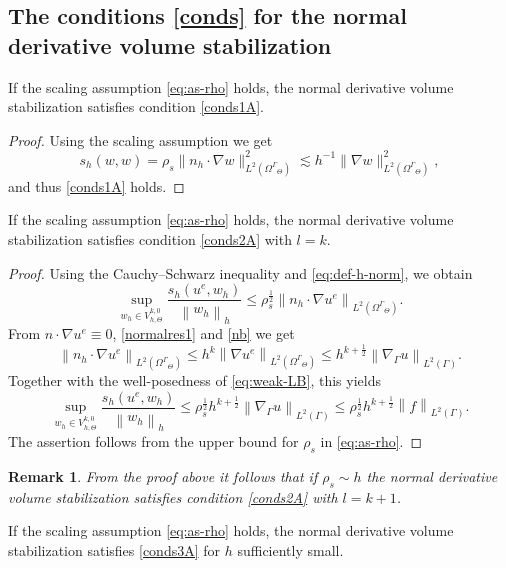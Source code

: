 \documentclass[final]{siamltex}
\newtheorem{remark}{Remark}
\begin{document}
\subsection{The conditions \eqref{conds} for the normal derivative volume stabilization} \label{sec:proofs:easy}
\begin{lemma}
  If the scaling assumption \eqref{eq:as-rho} holds, the normal derivative volume stabilization satisfies condition \eqref{conds1A}.
\end{lemma}

\begin{proof}
Using the scaling assumption we get
\[
  s_h(w,w) = \rho_s\|n_h \cdot \nabla w\|_{L^2({\Omega^{\Gamma}}_\Theta)}^2 \lesssim h^{-1} \|\nabla w\|_{L^2({\Omega^{\Gamma}}_\Theta)}^2,
\]
and thus
\eqref{conds1A} holds.
\end{proof}

\begin{lemma}
  If the scaling assumption \eqref{eq:as-rho} holds, the normal derivative volume stabilization satisfies condition \eqref{conds2A} with $l=k$.
\end{lemma}

\begin{proof}
Using the Cauchy--Schwarz inequality and \eqref{eq:def-h-norm}, we obtain
\[
  \sup_{w_h\in {V_{h,\Theta}^{k,0}}}\frac{s_h(u^e,w_h)}{{\left\lVert {w_h} \right\rVert}_h}\le \rho_s^{\frac12}{\left\lVert {n_h\cdot\nabla u^e} \right\rVert}_{L^2({\Omega^{\Gamma}}_\Theta)}.
\]
From $n\cdot\nabla u^e\equiv 0$, \eqref{normalres1} and \eqref{nb} we get
\[
  {\left\lVert {n_h\cdot\nabla u^e} \right\rVert}_{L^2({\Omega^{\Gamma}}_\Theta)}\le h^k{\left\lVert {\nabla u^e} \right\rVert}_{L^2({\Omega^{\Gamma}}_\Theta)}\le h^{k+\frac12}{\left\lVert {\nabla_\Gamma u} \right\rVert}_{L^2(\Gamma)}.
\]
Together with the well-posedness of \eqref{eq:weak-LB}, this yields
\[
  \sup_{w_h\in {V_{h,\Theta}^{k,0}}}\frac{s_h(u^e,w_h)}{{\left\lVert {w_h} \right\rVert}_h}\le \rho_s^{\frac12}h^{k+\frac12}{\left\lVert {\nabla_\Gamma u} \right\rVert}_{L^2(\Gamma)}\le \rho_s^{\frac12}h^{k+\frac12}{\left\lVert {f} \right\rVert}_{L^2(\Gamma)}.
\]
The assertion follows from the upper bound for $\rho_s$ in \eqref{eq:as-rho}.
\end{proof}
\begin{remark} \rm From the proof above it follows that if $\rho_s \sim h$ the normal derivative volume stabilization satisfies condition \eqref{conds2A} with $l=k+1$.
\end{remark}
\begin{lemma} \label{lemma3A}
   If the scaling assumption \eqref{eq:as-rho} holds, the normal derivative volume stabilization satisfies \eqref{conds3A} for $h$ sufficiently small.
\end{lemma}
\end{document}

